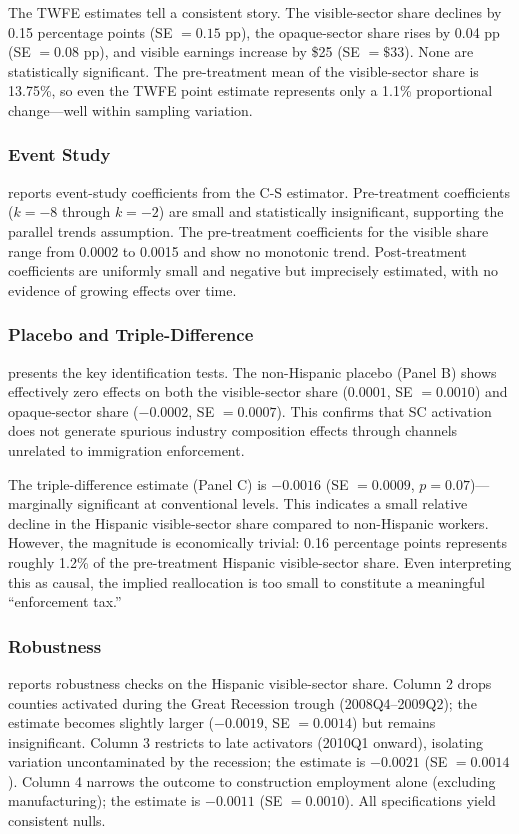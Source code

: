 \documentclass[12pt]{article}
\begin{document}
The TWFE estimates tell a consistent story. The visible-sector share declines by 0.15 percentage points (SE $= 0.15$ pp), the opaque-sector share rises by 0.04 pp (SE $= 0.08$ pp), and visible earnings increase by \$25 (SE $= \$33$). None are statistically significant. The pre-treatment mean of the visible-sector share is 13.75\%, so even the TWFE point estimate represents only a 1.1\% proportional change---well within sampling variation.



\subsubsection*{Event Study}  reports event-study coefficients from the C-S estimator. Pre-treatment coefficients ($k = -8$ through $k = -2$) are small and statistically insignificant, supporting the parallel trends assumption. The pre-treatment coefficients for the visible share range from 0.0002 to 0.0015 and show no monotonic trend. Post-treatment coefficients are uniformly small and negative but imprecisely estimated, with no evidence of growing effects over time.



\subsubsection*{Placebo and Triple-Difference}  presents the key identification tests. The non-Hispanic placebo (Panel B) shows effectively zero effects on both the visible-sector share ($0.0001$, SE $= 0.0010$) and opaque-sector share ($-0.0002$, SE $= 0.0007$). This confirms that SC activation does not generate spurious industry composition effects through channels unrelated to immigration enforcement.

The triple-difference estimate (Panel C) is $-0.0016$ (SE $= 0.0009$, $p = 0.07$)---marginally significant at conventional levels. This indicates a small relative decline in the Hispanic visible-sector share compared to non-Hispanic workers. However, the magnitude is economically trivial: 0.16 percentage points represents roughly 1.2\% of the pre-treatment Hispanic visible-sector share. Even interpreting this as causal, the implied reallocation is too small to constitute a meaningful ``enforcement tax.''



\subsubsection*{Robustness}  reports robustness checks on the Hispanic visible-sector share. Column 2 drops counties activated during the Great Recession trough (2008Q4--2009Q2); the estimate becomes slightly larger ($-0.0019$, SE $= 0.0014$) but remains insignificant. Column 3 restricts to late activators (2010Q1 onward), isolating variation uncontaminated by the recession; the estimate is $-0.0021$ (SE $= 0.0014$). Column 4 narrows the outcome to construction employment alone (excluding manufacturing); the estimate is $-0.0011$ (SE $= 0.0010$). All specifications yield consistent nulls.
\end{document}
